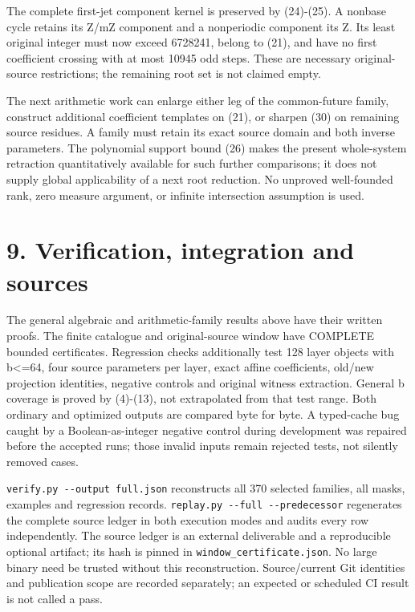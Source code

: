 The complete first-jet component kernel is preserved by (24)-(25). A
nonbase cycle retains its Z/mZ component and a nonperiodic component its
Z. Its least original integer must now exceed 6728241, belong to (21),
and have no first coefficient crossing with at most 10945 odd steps.
These are necessary original-source restrictions; the remaining root set
is not claimed empty.

The next arithmetic work can enlarge either leg of the common-future
family, construct additional coefficient templates on (21), or sharpen
(30) on remaining source residues. A family must retain its exact source
domain and both inverse parameters. The polynomial support bound (26)
makes the present whole-system retraction quantitatively available for
such further comparisons; it does not supply global applicability of a
next root reduction. No unproved well-founded rank, zero measure
argument, or infinite intersection assumption is used.

\section{9. Verification, integration and sources}

The general algebraic and arithmetic-family results above have their
written proofs. The finite catalogue and original-source window have
COMPLETE bounded certificates. Regression checks additionally test 128
layer objects with b\textless=64, four source parameters per layer,
exact affine coefficients, old/new projection identities, negative
controls and original witness extraction. General b coverage is proved
by (4)-(13), not extrapolated from that test range. Both ordinary and
optimized outputs are compared byte for byte. A typed-cache bug caught
by a Boolean-as-integer negative control during development was repaired
before the accepted runs; those invalid inputs remain rejected tests,
not silently removed cases.

\nolinkurl{verify.py --output full.json} reconstructs all 370 selected
families, all masks, examples and regression records.
\nolinkurl{replay.py --full --predecessor} regenerates the complete
source ledger in both execution modes and audits every row
independently. The source ledger is an external deliverable and a
reproducible optional artifact; its hash is pinned in
\nolinkurl{window_certificate.json}. No large binary need be trusted
without this reconstruction. Source/current Git identities and
publication scope are recorded separately; an expected or scheduled CI
result is not called a pass.

